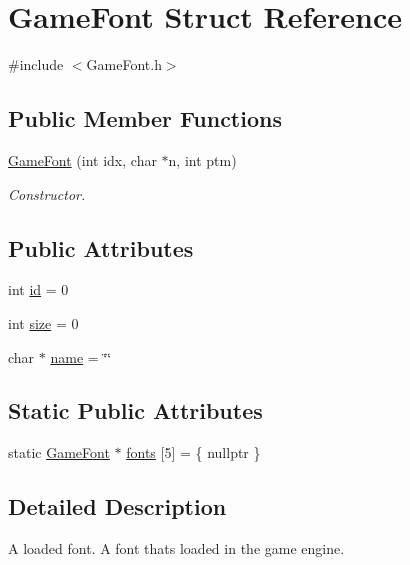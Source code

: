 \hypertarget{struct_game_font}{}\section{Game\+Font Struct Reference}
\label{struct_game_font}


{\ttfamily \#include $<$Game\+Font.\+h$>$}

\subsection*{Public Member Functions}
\begin{DoxyCompactItemize}
\item 
\hyperlink{struct_game_font_af30cf3bbdec633ab3f31491777ad29b6}{Game\+Font} (int idx, char $\ast$n, int ptm)
\begin{DoxyCompactList}\small\item\em Constructor. \end{DoxyCompactList}\end{DoxyCompactItemize}
\subsection*{Public Attributes}
\begin{DoxyCompactItemize}
\item 
int \hyperlink{struct_game_font_ae1e90d4b018bfa8edf42706e245d65f1}{id} = 0
\item 
int \hyperlink{struct_game_font_ae81748d3a1c3b0b53650449e0fd4aeb5}{size} = 0
\item 
char $\ast$ \hyperlink{struct_game_font_a144b59d96bf37c8876b2cd1f7db64d12}{name} = \char`\"{}\char`\"{}
\end{DoxyCompactItemize}
\subsection*{Static Public Attributes}
\begin{DoxyCompactItemize}
\item 
static \hyperlink{struct_game_font}{Game\+Font} $\ast$ \hyperlink{struct_game_font_ac09bfa463d59669ccff031e3e43558ed}{fonts} \mbox{[}5\mbox{]} = \{ nullptr \}
\end{DoxyCompactItemize}


\subsection{Detailed Description}
A loaded font. A font that\textquotesingle{}s loaded in the game engine. 

